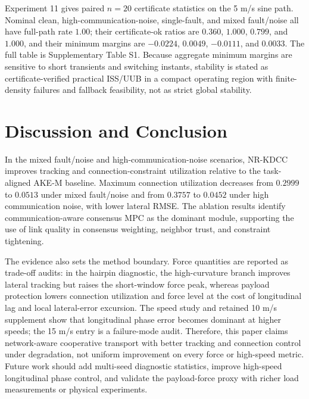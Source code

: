 \documentclass[twocolumn,3p,times,procedia]{elsarticle}
\newcommand{\AKE}{AKE-M}
\newcommand{\Method}{NR-KDCC}
\begin{document}
Experiment 11 gives paired $n=20$ certificate statistics on the 5 m/s sine path. Nominal clean, high-communication-noise, single-fault, and mixed fault/noise all have full-path rate $1.00$; their certificate-ok ratios are $0.360$, $1.000$, $0.799$, and $1.000$, and their minimum margins are $-0.0224$, $0.0049$, $-0.0111$, and $0.0033$. The full table is Supplementary Table S1. Because aggregate minimum margins are sensitive to short transients and switching instants, stability is stated as certificate-verified practical ISS/UUB in a compact operating region with finite-density failures and fallback feasibility, not as strict global stability.

\FloatBarrier

\section{Discussion and Conclusion}

In the mixed fault/noise and high-communication-noise scenarios, \Method{} improves tracking and connection-constraint utilization relative to the task-aligned \AKE{} baseline. Maximum connection utilization decreases from $0.2999$ to $0.0513$ under mixed fault/noise and from $0.3757$ to $0.0452$ under high communication noise, with lower lateral RMSE. The ablation results identify communication-aware consensus MPC as the dominant module, supporting the use of link quality in consensus weighting, neighbor trust, and constraint tightening.

The evidence also sets the method boundary. Force quantities are reported as trade-off audits: in the hairpin diagnostic, the high-curvature branch improves lateral tracking but raises the short-window force peak, whereas payload protection lowers connection utilization and force level at the cost of longitudinal lag and local lateral-error excursion. The speed study and retained 10 m/s supplement show that longitudinal phase error becomes dominant at higher speeds; the 15 m/s entry is a failure-mode audit. Therefore, this paper claims network-aware cooperative transport with better tracking and connection control under degradation, not uniform improvement on every force or high-speed metric. Future work should add multi-seed diagnostic statistics, improve high-speed longitudinal phase control, and validate the payload-force proxy with richer load measurements or physical experiments.

\FloatBarrier
\begingroup
\fontsize{7}{7}\selectfont
\setlength{\bibsep}{0pt plus 0.1ex}


\endgroup
\end{document}
